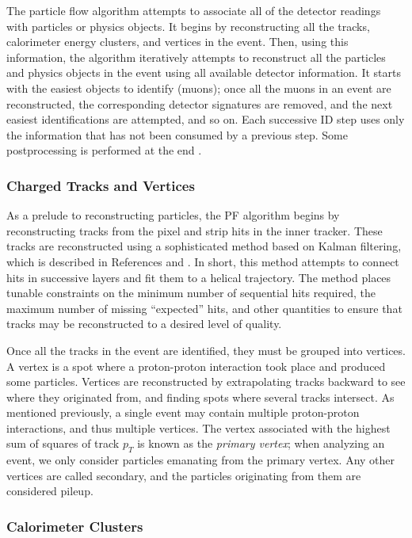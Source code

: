 The particle flow algorithm attempts to associate all of the detector
readings with particles or physics objects. It begins by
reconstructing all the tracks, calorimeter energy clusters, and
vertices in the event. Then, using this information, the algorithm
iteratively attempts to reconstruct all the particles and physics
objects in the event using all available detector information. It
starts with the easiest objects to identify (muons); once all the
muons in an event are reconstructed, the corresponding detector
signatures are removed, and the next easiest identifications are
attempted, and so on. Each successive ID step uses only the
information that has not been consumed by a previous step. Some
postprocessing is performed at the end \cite{particleflow}.

\subsubsection{Charged Tracks and Vertices}
\label{sssec:cms:pf:trackvert}

As a prelude to reconstructing particles, the PF algorithm begins by
reconstructing tracks from the pixel and strip hits in the inner
tracker. These tracks are reconstructed using a sophisticated method
based on Kalman filtering, which is described in References
\cite{kalman1} and \cite{kalman2}. In short, this method attempts to
connect hits in successive layers and fit them to a helical
trajectory. The method places tunable constraints on the minimum
number of sequential hits required, the maximum number of missing
``expected'' hits, and other quantities to ensure that tracks may be
reconstructed to a desired level of quality.

Once all the tracks in the event are identified, they must be grouped
into vertices. A vertex is a spot where a proton-proton interaction
took place and produced some particles. Vertices are reconstructed by
extrapolating tracks backward to see where they originated from, and finding
spots where several tracks intersect. As mentioned previously, a
single event may contain multiple proton-proton interactions, and thus
multiple vertices. The vertex associated with the highest sum of
squares of track $p_T$ is known as the \emph{primary vertex}; when
analyzing an event, we only consider particles emanating from the
primary vertex. Any other vertices are called secondary, and the
particles originating from them are considered pileup.

\subsubsection{Calorimeter Clusters}
\label{sssec:cms:pf:caloclusters}

